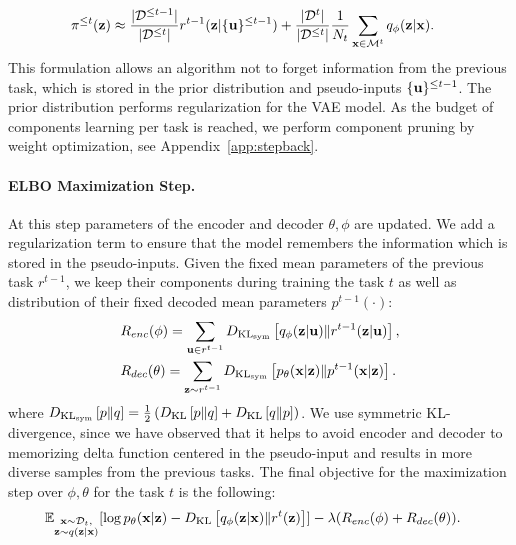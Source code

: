 \begin{equation}
\begin{aligned}
& \pi^{\leq t}({\mathbf{z}}) \approx  \frac{|\mathcal{D}^{\leq t-1}|}{|\mathcal{D}^{\leq t}|} r^{t-1}({\mathbf{z}}|\{{\mathbf{u}}\}^{\leq t-1}) + \frac{|\mathcal{D}^{t}|}{|\mathcal{D}^{\leq t}|} \frac{1}{N_{t}}\sum_{{\mathbf{x}} \in  \mathcal{M}^t} q_{\phi}({\mathbf{z}}|{\mathbf{x}}).
\end{aligned}
\end{equation}
This formulation allows an algorithm not to forget information from the previous task, which is stored in the prior distribution and pseudo-inputs $\{{\mathbf{u}}\}^{\leq t-1}$. The prior distribution performs regularization for the VAE model. As the budget of components learning per task is reached, we perform component pruning by weight optimization, see Appendix~\ref{app:stepback}.
\paragraph{ELBO Maximization Step.} At this step parameters of the encoder and decoder $\theta,\phi$ are updated. We add a regularization term to ensure that the model remembers the information which is stored in the pseudo-inputs. Given the fixed mean parameters of the previous task $r^{t-1}$, we keep their components during training the task $t$ as well as distribution of their fixed decoded mean parameters $p^{t-1}(\cdot)$:
\begin{align}\label{eq:reqularizers}
   & R_{enc}(\phi)=\sum_{\rvu\in r^{t-1}}\KLsym{q_{\phi}(\rvz|\rvu)}{r^{t-1}(\rvz|\rvu)}, \\ 
   & R_{dec}(\theta)=\sum_{\rvz \sim r^{t-1}}\KLsym{p_\theta(\rvx|\rvz)}{p^{t-1}(\rvx|\rvz)}.
\end{align}
where $D_{\mathrm{KL}_{\text{sym}}}\left[p\|q\right] = \tfrac12\left(D_{\mathrm{KL}}\left[p\|q\right] + D_{\mathrm{KL}}\left[q\|p\right]\right)$. We use symmetric KL-divergence, since we have observed that it helps to avoid encoder and decoder to memorizing delta function centered in the pseudo-input and results in more diverse samples from the previous tasks. 
The final objective for the maximization step over $\phi, \theta$ for the task $t$ is the following:
\begin{equation} \label{eq:obj_with_reg}
    \begin{aligned}
    & \E_{\substack{\rvx\sim\train_t,\\\rvz\sim q(\rvz|\rvx)}}[\log p_{\theta}(\rvx|\rvz) - \KL{q_{\phi}(\rvz|\rvx)}{r^{t}(\rvz)}] - \lambda (R_{enc}(\phi) + R_{dec}(\theta)).
    \end{aligned}
\end{equation}

